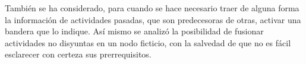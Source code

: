 También se ha considerado, para cuando se hace necesario traer de alguna forma la información de actividades pasadas, que son predecesoras de otras, activar una bandera que lo indique. Así mismo se analizó la posibilidad de fusionar actividades no disyuntas en un nodo ficticio, con la salvedad de que no es fácil esclarecer con certeza sus prerrequisitos.

